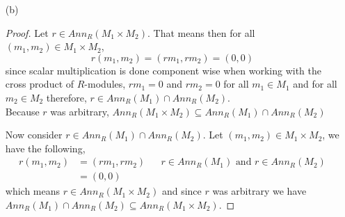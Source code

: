 \documentclass[11pt]{article}
\begin{document}
\begin{itemize}
\begin{itemize}
\begin{proof}
            Let $r \in R$ and $a \in I$. We want to show $ra \in I$, so let $m \in M$. We see through the following,
            \begin{align*}
                (ra)m &= r(am) && a \in I \\
                &= r0 \\
                &= 0
            \end{align*}
            $ra$ is in $I$. Now we want to show that $ar \in I$,
            \begin{align*}
                (ar)m &= a(rm) && \text{$M$ is closed under scalars so $rm \in M$, and $a \in I$} \\
                &= 0
            \end{align*}
            Now with all this together we have that $\textit{Ann}_R(M)$ is a bilateral ideal of $R$
        \end{proof}  
        \item[(b)]
        \begin{proof}
            Let $r \in \textit{Ann}_R(M_1 \times M_2)$. That means then for all $(m_1,m_2) \in M_1 \times M_2$,
            \[r(m_1, m_2) = (rm_1, rm_2) = (0,0)\]
             since scalar multiplication is done component wise when working with the cross product of $R$-modules, $rm_1 = 0$ and $rm_2 = 0$ for all $m_1\in M_1$ and for all $m_2 \in M_2 $ therefore, $r \in \textit{Ann}_R(M_1) \cap \textit{Ann}_R(M_2)$. \\ Because $r$ was arbitrary, $\textit{Ann}_R(M_1 \times M_2 )\subseteq \textit{Ann}_R(M_1) \cap \textit{Ann}_R(M_2) $

            Now consider $r\in \textit{Ann}_R(M_1)\cap \textit{Ann}_R(M_2)$. Let $(m_1, m_2) \in M_1 \times M_2$, we have the following,
            \begin{align*}
                r(m_1,m_2) &= (rm_1, rm_2) && r \in \textit{Ann}_R(M_1)  \text{ and } r\in \textit{Ann}_R(M_2) \\
                &= (0,0)
            \end{align*}
            which means $r \in \textit{Ann}_R(M_1 \times M_2)$ and since $r$ was arbitrary we have $\textit{Ann}_R(M_1)\cap \textit{Ann}_R(M_2) \subseteq \textit{Ann}_R(M_1 \times M_2)$.


\end{proof}
\end{itemize}
\end{itemize}
\end{document}
